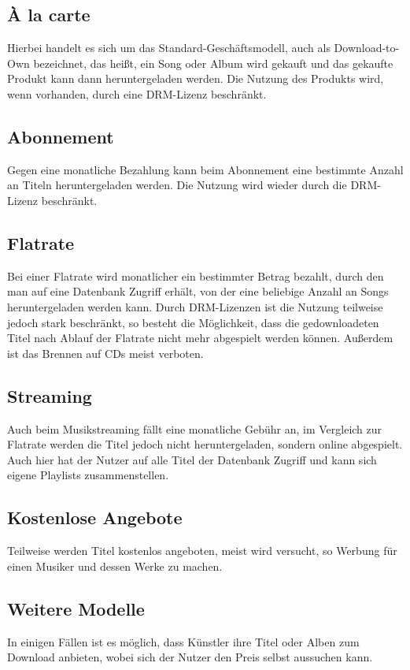 \documentclass{extarticle}
\begin{document}
		\subsection{À la carte}
		Hierbei handelt es sich um das Standard-Geschäftsmodell, auch als Download-to-Own bezeichnet, das heißt, ein Song oder Album wird gekauft und das gekaufte Produkt kann dann heruntergeladen werden. Die Nutzung des Produkts wird, wenn vorhanden, durch eine DRM-Lizenz beschränkt. \cite{modelleWiki}
		
		\subsection{Abonnement}
		Gegen eine monatliche Bezahlung kann beim Abonnement eine bestimmte Anzahl an Titeln heruntergeladen werden. Die Nutzung wird wieder durch die DRM-Lizenz beschränkt. \cite{modelleWiki}
		
		\subsection{Flatrate}
		Bei einer Flatrate wird monatlicher ein bestimmter Betrag bezahlt, durch den man auf eine Datenbank Zugriff erhält, von der eine beliebige Anzahl an Songs heruntergeladen werden kann. Durch DRM-Lizenzen ist die Nutzung teilweise jedoch stark beschränkt, so besteht die Möglichkeit, dass die gedownloadeten Titel nach Ablauf der Flatrate nicht mehr abgespielt werden können. Außerdem ist das Brennen auf CDs meist verboten. \cite{modelleWiki}
		
		\subsection{Streaming}
		Auch beim Musikstreaming fällt eine monatliche Gebühr an, im Vergleich zur Flatrate werden die Titel jedoch nicht heruntergeladen, sondern online abgespielt. Auch hier hat der Nutzer auf alle Titel der Datenbank Zugriff und kann sich eigene Playlists zusammenstellen. \cite{modelleWiki}
		
		\subsection{Kostenlose Angebote}
		Teilweise werden Titel kostenlos angeboten, meist wird versucht, so Werbung für einen Musiker und dessen Werke zu machen. \cite{modelleWiki}
		
		\subsection{Weitere Modelle}
		In einigen Fällen ist es möglich, dass Künstler ihre Titel oder Alben zum Download anbieten, wobei sich der Nutzer den Preis selbst aussuchen kann. \cite{modelleWiki}
		
	\onecolumn
	
	
\end{document}
